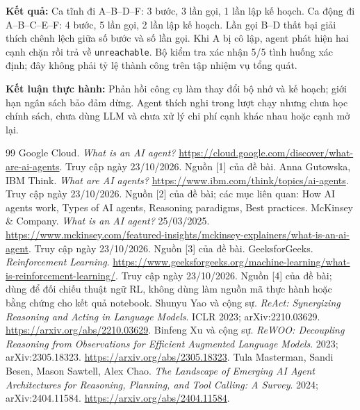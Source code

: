 \documentclass[11pt,a4paper]{article}
\begin{document}
\noindent\textbf{Kết quả:} Ca tĩnh đi A--B--D--F: 3 bước, 3 lần gọi, 1 lần lập kế hoạch.
Ca động đi A--B--C--E--F: 4 bước, 5 lần gọi, 2 lần lập kế hoạch.
Lần gọi B--D thất bại giải thích chênh lệch giữa số bước và số lần gọi. Khi A bị cô lập,
agent phát hiện hai cạnh chặn rồi trả về \texttt{unreachable}. Bộ kiểm tra xác nhận
5/5 tình huống xác định; đây không phải tỷ lệ thành công trên tập nhiệm vụ tổng quát.

\noindent\textbf{Kết luận thực hành:} Phản hồi công cụ làm thay đổi bộ nhớ và kế hoạch;
giới hạn ngân sách bảo đảm dừng. Agent thích nghi trong lượt chạy nhưng chưa học chính
sách, chưa dùng LLM và chưa xử lý chi phí cạnh khác nhau hoặc cạnh mở lại.



\newpage
{}
\begin{thebibliography}{99}
 Google Cloud. \emph{What is an AI agent?}
\url{https://cloud.google.com/discover/what-are-ai-agents}.
Truy cập ngày 23/10/2026. Nguồn [1] của đề bài.
 Anna Gutowska, IBM Think. \emph{What are AI agents?}
\url{https://www.ibm.com/think/topics/ai-agents}.
Truy cập ngày 23/10/2026. Nguồn [2] của đề bài; các mục liên quan:
How AI agents work, Types of AI agents, Reasoning paradigms, Best practices.
 McKinsey \& Company. \emph{What is an AI agent?}
25/03/2025.
\url{https://www.mckinsey.com/featured-insights/mckinsey-explainers/what-is-an-ai-agent}.
Truy cập ngày 23/10/2026. Nguồn [3] của đề bài.
 GeeksforGeeks. \emph{Reinforcement Learning}.
\url{https://www.geeksforgeeks.org/machine-learning/what-is-reinforcement-learning/}.
Truy cập ngày 23/10/2026. Nguồn [4] của đề bài; dùng để đối chiếu thuật ngữ RL,
không dùng làm nguồn mã thực hành hoặc bằng chứng cho kết quả notebook.
 Shunyu Yao và cộng sự. \emph{ReAct: Synergizing Reasoning and Acting
in Language Models}. ICLR 2023; arXiv:2210.03629.
\url{https://arxiv.org/abs/2210.03629}.
 Binfeng Xu và cộng sự. \emph{ReWOO: Decoupling Reasoning from
Observations for Efficient Augmented Language Models}. 2023; arXiv:2305.18323.
\url{https://arxiv.org/abs/2305.18323}.
 Tula Masterman, Sandi Besen, Mason Sawtell, Alex Chao.
\emph{The Landscape of Emerging AI Agent Architectures for Reasoning, Planning,
and Tool Calling: A Survey}. 2024; arXiv:2404.11584.
\url{https://arxiv.org/abs/2404.11584}.

\end{thebibliography}
\end{document}
